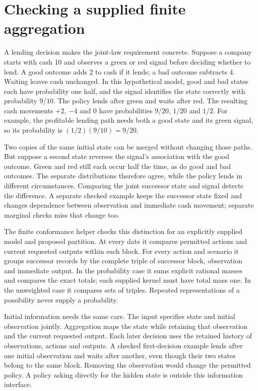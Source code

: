 \section{Checking a supplied finite aggregation}
\label{sim:finite-quotient}

A lending decision makes the joint-law requirement concrete. Suppose a company
starts with cash 10 and observes a green or red signal before deciding whether
to lend. A good outcome adds 2 to cash if it lends; a bad outcome subtracts 4.
Waiting leaves cash unchanged. In this hypothetical model, good and bad states
each have probability one half, and the signal identifies the state correctly
with probability $9/10$. The policy lends after green and waits after red.
The resulting cash movements $+2$, $-4$ and 0 have probabilities $9/20$,
$1/20$ and $1/2$. For example, the profitable lending path needs both a good
state and its green signal, so its probability is $(1/2)(9/10)=9/20$.

Two copies of the same initial state can be merged without changing those
paths. But suppose a second state reverses the signal's association with the
good outcome. Green and red still each occur half the time, as do good and bad
outcomes. The separate distributions therefore agree, while the policy lends
in different circumstances. Comparing the joint successor state and signal
detects the difference. A separate checked example keeps the successor state
fixed and changes dependence between observation and immediate cash movement;
separate marginal checks miss that change too.

The finite conformance helper checks this distinction for an explicitly
supplied model and proposed partition. At every date it compares permitted
actions and current requested outputs within each block. For every action and
scenario it groups successor records by the complete triple of successor
block, observation and immediate output. In the probability case it sums
explicit rational masses and compares the exact totals; each supplied kernel
must have total mass one. In the unweighted case it compares sets of triples.
Repeated representations of a possibility never supply a probability.

Initial information needs the same care. The input specifies state and initial
observation jointly. Aggregation maps the state while retaining that
observation and the current requested output. Each later decision uses the
retained history of observations, actions and outputs. A checked first-decision
example lends after one initial observation and waits after another, even
though their two states belong to the same block. Removing the observation
would change the permitted policy. A policy asking directly for the hidden
state is outside this information interface.

